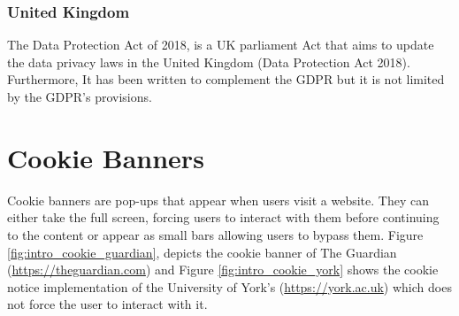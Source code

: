 \documentclass[../main.tex]{subfiles}
\begin{document}
\subsubsection{United Kingdom}
The Data Protection Act of 2018, is a UK parliament Act that aims to update the data privacy laws in the United Kingdom \cite{dpa_2018} (Data Protection Act 2018). Furthermore, It has been written to complement the GDPR but it is not limited by the GDPR’s provisions. 

\section{Cookie Banners}
Cookie banners are pop-ups that appear when users visit a website. They can either take the full screen, forcing users to interact with them before continuing to the content or appear as small bars allowing users to bypass them. Figure \ref{fig:intro_cookie_guardian}, depicts the  cookie banner of The Guardian (\url{https://theguardian.com}) and Figure \ref{fig:intro_cookie_york} shows the cookie notice implementation of the University of York’s (\url{https://york.ac.uk}) which does not force the user to interact with it. 
\end{document}

